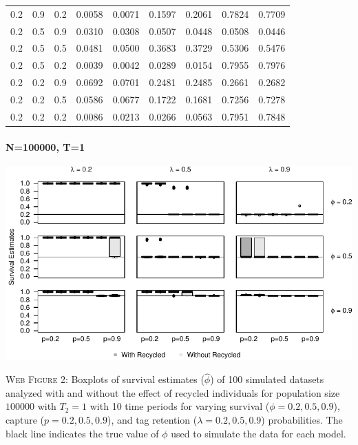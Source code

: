 \documentclass[]{article}
\let\oldparagraph\paragraph
\renewcommand{\paragraph}[1]{\oldparagraph{#1}\mbox{}}
\begin{document}
\begin{table}[ht]
{\begin{tabular}{rrrrrrrrr}
  0.2 & 0.9 & 0.2 & 0.0058 & 0.0071 & 0.1597 & 0.2061 & 0.7824 & 0.7709 \\ 
  0.2 & 0.5 & 0.9 & 0.0310 & 0.0308 & 0.0507 & 0.0448 & 0.0508 & 0.0446 \\ 
  0.2 & 0.5 & 0.5 & 0.0481 & 0.0500 & 0.3683 & 0.3729 & 0.5306 & 0.5476 \\ 
  0.2 & 0.5 & 0.2 & 0.0039 & 0.0042 & 0.0289 & 0.0154 & 0.7955 & 0.7976 \\ 
  0.2 & 0.2 & 0.9 & 0.0692 & 0.0701 & 0.2481 & 0.2485 & 0.2661 & 0.2682 \\ 
  0.2 & 0.2 & 0.5 & 0.0586 & 0.0677 & 0.1722 & 0.1681 & 0.7256 & 0.7278 \\ 
  0.2 & 0.2 & 0.2 & 0.0086 & 0.0213 & 0.0266 & 0.0563 & 0.7951 & 0.7848 \\ 
   \hline
\end{tabular}
}
\endgroup
\end{table}

\newpage 

\paragraph{N=100000, T=1}\label{n100000-t1}

\includegraphics{Appendix_BW_files/figure-latex/figure2_survival_GJSTL2-1.pdf}

\textsc{Web Figure 2:} Boxplots of survival estimates (\(\hat{\phi}\))
of 100 simulated datasets analyzed with and without the effect of
recycled individuals for population size \(100000\) with \(T_2=1\) with
10 time periods for varying survival (\(\phi=0.2,0.5,0.9\)), capture
(\(p=0.2,0.5,0.9\)), and tag retention (\(\lambda=0.2,0.5,0.9\))
probabilities. The black line indicates the true value of \(\phi\) used
to simulate the data for each model.
\end{document}
